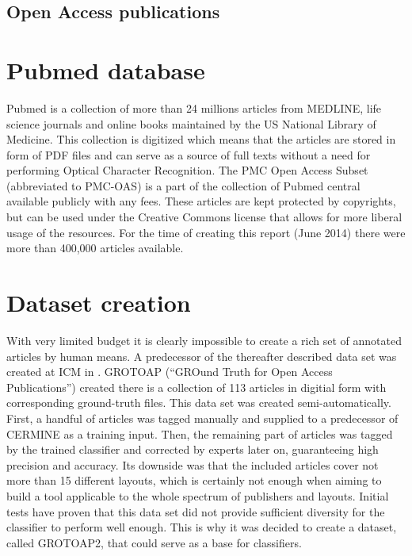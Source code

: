 \subsection{Open Access publications}
\section{Pubmed database}
Pubmed \cite{Pubmed} is a collection of more than 24 millions articles from MEDLINE, life science journals and online books maintained by the US National Library of Medicine. This collection is digitized which means that the articles are stored in form of PDF files and can serve as a source of full texts without a need for performing Optical Character Recognition. 
The PMC Open Access Subset (abbreviated to PMC-OAS) is a part of the collection of Pubmed central available publicly with any fees. These articles are kept protected by copyrights, but can be used under the Creative Commons license that allows for more liberal usage of the resources. For the time of creating this report (June 2014) there were more than 400,000 articles available.
\section{Dataset creation}
With very limited budget it is clearly impossible to create a rich set of annotated articles by human means. A predecessor of the thereafter described data set was created at ICM in \cite{Tkaczyk2012}. GROTOAP (``GROund Truth for Open Access Publications'') created there is a collection of 113 articles in digitial form with corresponding ground-truth files. This data set was created semi-automatically. First, a handful of articles was tagged manually and supplied to a predecessor of CERMINE as a training input. Then, the remaining part of articles was tagged by the trained classifier and corrected by experts later on, guaranteeing high precision and accuracy. Its downside was that the included articles cover not more than 15 different layouts, which is certainly not enough when aiming to build a tool applicable to the whole spectrum of publishers and layouts. Initial tests have proven that this data set did not provide sufficient diversity for the classifier to perform well enough. This is why it was decided to create a dataset, called GROTOAP2, that could serve as a base for classifiers.

